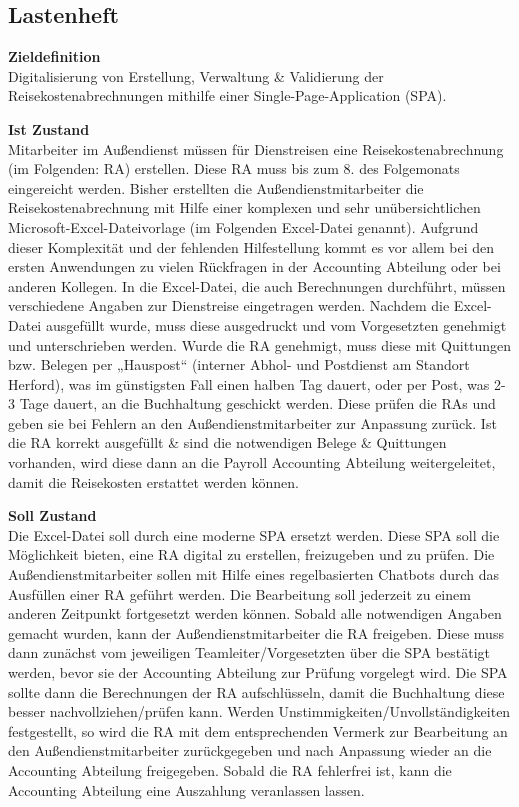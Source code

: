 \subsection{Lastenheft}
\label{sec:Anhang:Lastenheft}
\textbf{Zieldefinition}\\
Digitalisierung von Erstellung, Verwaltung \& Validierung der Reisekostenabrechnungen mithilfe einer Single-Page-Application (SPA).

\textbf{Ist Zustand}\\
Mitarbeiter im Außendienst müssen für Dienstreisen eine Reisekostenabrechnung (im Folgenden: RA) erstellen. Diese RA muss bis zum 8. des Folgemonats eingereicht werden. Bisher erstellten die Außendienstmitarbeiter die Reisekostenabrechnung mit Hilfe einer komplexen und sehr unübersichtlichen Microsoft-Excel-Dateivorlage (im Folgenden Excel-Datei genannt). Aufgrund dieser Komplexität und der fehlenden Hilfestellung kommt es vor allem bei den ersten Anwendungen zu vielen Rückfragen in der Accounting Abteilung oder bei anderen Kollegen. In die Excel-Datei, die auch Berechnungen durchführt, müssen verschiedene Angaben zur Dienstreise eingetragen werden. Nachdem die Excel-Datei ausgefüllt wurde, muss diese ausgedruckt und vom Vorgesetzten genehmigt und unterschrieben werden. Wurde die RA genehmigt, muss diese mit Quittungen bzw. Belegen per „Hauspost“ (interner Abhol- und Postdienst am Standort Herford), was im günstigsten Fall einen halben Tag dauert, oder per Post, was 2-3 Tage dauert, an die Buchhaltung geschickt werden.
Diese prüfen die RAs und geben sie bei Fehlern an den Außendienstmitarbeiter zur Anpassung zurück. Ist die RA korrekt ausgefüllt \& sind die notwendigen Belege \& Quittungen vorhanden, wird diese dann an die Payroll Accounting Abteilung weitergeleitet, damit die Reisekosten erstattet werden können.

\textbf{Soll Zustand}\\
Die Excel-Datei soll durch eine moderne SPA ersetzt werden. Diese SPA soll die Möglichkeit bieten, eine RA digital zu erstellen, freizugeben und zu prüfen. Die Außendienstmitarbeiter sollen mit Hilfe eines regelbasierten Chatbots durch das Ausfüllen einer RA geführt werden. Die Bearbeitung soll jederzeit zu einem anderen Zeitpunkt fortgesetzt werden können. Sobald alle notwendigen Angaben gemacht wurden, kann der Außendienstmitarbeiter die RA freigeben. Diese muss dann zunächst vom jeweiligen Teamleiter/Vorgesetzten über die SPA bestätigt werden, bevor sie der Accounting Abteilung zur Prüfung vorgelegt wird. Die SPA sollte dann die Berechnungen der RA aufschlüsseln, damit die Buchhaltung diese besser nachvollziehen/prüfen kann. Werden Unstimmigkeiten/Unvollständigkeiten festgestellt, so wird die RA mit dem entsprechenden Vermerk zur Bearbeitung an den Außendienstmitarbeiter zurückgegeben und nach Anpassung wieder an die Accounting Abteilung freigegeben. Sobald die RA fehlerfrei ist, kann die Accounting Abteilung eine Auszahlung veranlassen lassen.

